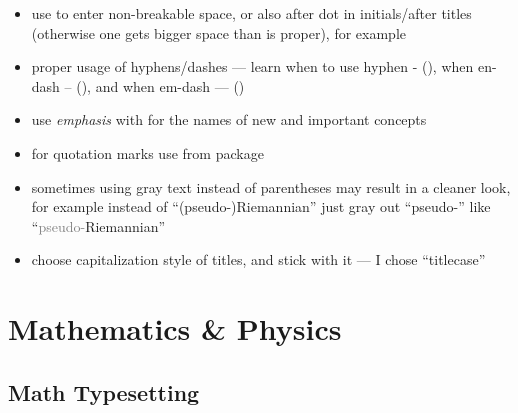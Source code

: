 \begin{itemize}
    \item use \macro{~} to enter non-breakable space, or also after dot in initials/after titles
          (otherwise one gets bigger space than is proper), for example 
    \item proper usage of hyphens/dashes --- learn when to use hyphen - (\macro{-}), when en-dash -- (\macro{--}), and when em-dash --- (\macro{---})
    \item use \emph{emphasis} with \macro{\emph} for the names of new and important concepts
    \item for quotation marks use \macro{\enquote} from  package
    \item sometimes using gray text instead of parentheses may result in a cleaner look, for example instead of \enquote{(pseudo-)Riemannian} just gray out \enquote{pseudo-} like \enquote{\textcolor{gray}{pseudo-}Riemannian}
    \item choose capitalization style of titles, and stick with it --- I chose \enquote{titlecase}
\end{itemize}


\section{Mathematics \& Physics}%
\label{sec:MathematicsandPhysics}

\subsection{Math Typesetting}%
\label{sub:Math Typesetting}

